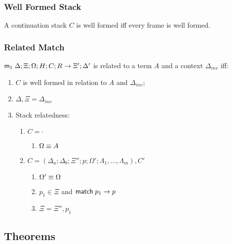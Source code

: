 \subsubsection{Well Formed Stack}

\begin{definition}
A continuation stack $C$ is well formed iff every frame is well formed.
\end{definition}

\subsubsection{Related Match}\label{sec:related_match}

\begin{definition}
   
$\mathsf{m}_1 \; \Delta; \Xi; \Omega; H; C; R \rightarrow \Xi'; \Delta'$ is related to a term $A$ and a context $\Delta_{inv}$ iff:

\begin{enumerate}
   \item $C$ is well formed in relation to $A$ and $\Delta_{inv}$;
   \item $\Delta, \Xi = \Delta_{inv}$
   \item Stack relatedness:
   \begin{enumerate}
      \item $C = \cdot$
   
      \begin{enumerate}
         \item $\Omega \equiv A$
      \end{enumerate}
      
      \item $C = (\Delta_a; \Delta_b; \Xi''; p; \Omega'; \Lambda_1, ..., \Lambda_m), C'$
      
      \begin{enumerate}
         \item $\Omega' \equiv \Omega$
         \item $p_1 \in \Xi$ and $\mathsf{match} \; p_1 \rightarrow p$
         \item $\Xi = \Xi'', p_1$
      \end{enumerate}
   \end{enumerate}
\end{enumerate}

\end{definition}

\subsection{Theorems}

